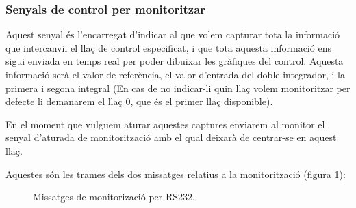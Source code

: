 \subsubsection{Senyals de control per monitoritzar}\label{cap:dis:comSer:monitor}

Aquest senyal és l'encarregat d'indicar al \Monitor que volem capturar tota la informació que intercanvii el llaç de control especificat, i que tota aquesta informació ens sigui enviada en temps real per poder dibuixar les gràfiques del control. Aquesta informació serà el valor de referència, el valor d'entrada del doble integrador, i la primera i segona integral (En cas de no indicar-li quin llaç volem monitoritzar per defecte li demanarem el llaç 0, que és el primer llaç disponible).

En el moment que vulguem aturar aquestes captures enviarem al monitor el senyal d'aturada de monitorització amb el qual deixarà de centrar-se en aquest llaç.

Aquestes són les trames dels dos missatges relatius a la monitorització (figura \ref{fig:bit_encoding:monitor}):

\begin{figure}[ht!]
	
    \caption{Missatges de monitorizació per RS232.}
    \label{fig:bit_encoding:monitor}
\end{figure}


